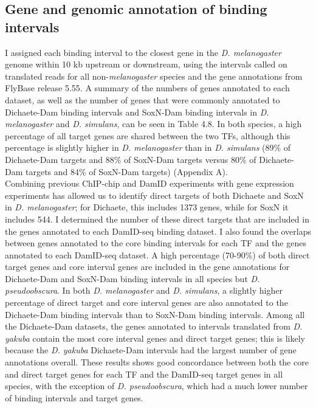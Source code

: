 \subsection{Gene and genomic annotation of binding intervals}
I assigned each binding interval to the closest gene in the \emph{D. melanogaster} genome within 10 kb upstream or downstream, using the intervals called on translated reads for all non-\emph{melanogaster} species and the gene annotations from FlyBase release 5.55. A summary of the numbers of genes annotated to each dataset, as well as the number of genes that were commonly annotated to Dichaete-Dam binding intervals and SoxN-Dam binding intervals in \emph{D. melanogaster} and \emph{D. simulans}, can be seen in Table 4.8. In both species, a high percentage of all target genes are shared between the two TFs, although this percentage is slightly higher in \emph{D. melanogaster} than in \emph{D. simulans} (89\% of Dichaete-Dam targets and 88\% of SoxN-Dam targets versus 80\% of Dichaete-Dam targets and 84\% of SoxN-Dam targets) (Appendix A).\\

Combining previous ChIP-chip and DamID experiments with gene expression experiments has allowed us to identify direct targets of both Dichaete and SoxN in \emph{D. melanogaster}; for Dichaete, this includes 1373 genes, while for SoxN it includes 544. I determined the number of these direct targets that are included in the genes annotated to each DamID-seq binding dataset. I also found the overlaps between genes annotated to the core binding intervals for each TF and the genes annotated to each DamID-seq dataset. A high percentage (70-90\%) of both direct target genes and core interval genes are included in the gene annotations for Dichaete-Dam and SoxN-Dam binding intervals in all species but \emph{D. pseudoobscura}. In both \emph{D. melanogaster} and \emph{D. simulans}, a slightly higher percentage of direct target and core interval genes are also annotated to the Dichaete-Dam binding intervals than to SoxN-Dam binding intervals. Among all the Dichaete-Dam datasets, the genes annotated to intervals translated from \emph{D. yakuba} contain the most core interval genes and direct target genes; this is likely because the \emph{D. yakuba} Dichaete-Dam intervals had the largest number of gene annotations overall. These results shows good concordance between both the core and direct target genes for each TF and the DamID-seq target genes in all species, with the exception of \emph{D. pseudoobscura}, which had a much lower number of binding intervals and target genes.\\

